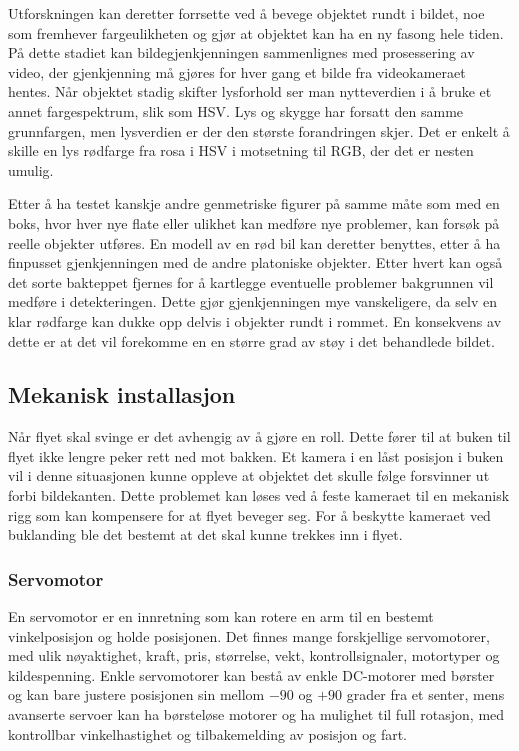 Utforskningen kan deretter forrsette ved å bevege objektet rundt i bildet, noe som fremhever fargeulikheten og gjør at objektet kan ha en ny fasong hele tiden. På dette stadiet kan bildegjenkjenningen sammenlignes med prosessering av video, der gjenkjenning må gjøres for hver gang et bilde fra videokameraet hentes. Når objektet stadig skifter lysforhold ser man nytteverdien i å bruke et annet fargespektrum, slik som HSV. Lys og skygge har forsatt den samme grunnfargen, men lysverdien er der den største forandringen skjer. Det er enkelt å skille en lys rødfarge fra rosa i HSV i motsetning til RGB, der det er nesten umulig. 

Etter å ha testet kanskje andre genmetriske figurer på samme måte som med en boks, hvor hver nye flate eller ulikhet kan medføre nye problemer, kan forsøk på reelle objekter utføres. En modell av en rød bil kan deretter benyttes, etter å ha finpusset gjenkjenningen med de andre platoniske objekter. Etter hvert kan også det sorte bakteppet fjernes for å kartlegge eventuelle problemer bakgrunnen vil medføre i detekteringen. Dette gjør gjenkjenningen mye vanskeligere, da selv en klar rødfarge kan dukke opp delvis i objekter rundt i rommet. En konsekvens av dette er at det vil forekomme en en større grad av støy i det behandlede bildet.  

\subsection{Mekanisk installasjon}
Når flyet skal svinge er det avhengig av å gjøre en roll. Dette fører til at buken til flyet ikke lengre peker rett ned mot bakken. Et kamera i en låst posisjon i buken vil i denne situasjonen kunne oppleve at objektet det skulle følge forsvinner ut forbi bildekanten. Dette problemet kan løses ved å feste kameraet til en mekanisk rigg som kan kompensere for at flyet beveger seg. For å beskytte kameraet ved buklanding ble det bestemt at det skal kunne trekkes inn i flyet.


\subsubsection{Servomotor}

En servomotor er en innretning som kan rotere en arm til en bestemt vinkelposisjon og holde posisjonen. Det finnes mange forskjellige servomotorer, med ulik nøyaktighet, kraft, pris, størrelse, vekt, kontrollsignaler, motortyper og kildespenning. Enkle servomotorer kan bestå av enkle DC-motorer med børster og kan bare justere posisjonen sin mellom $-90$ og $+90$ grader fra et senter, mens avanserte servoer kan ha børsteløse motorer og ha mulighet til full rotasjon, med kontrollbar vinkelhastighet og tilbakemelding av posisjon og fart.

